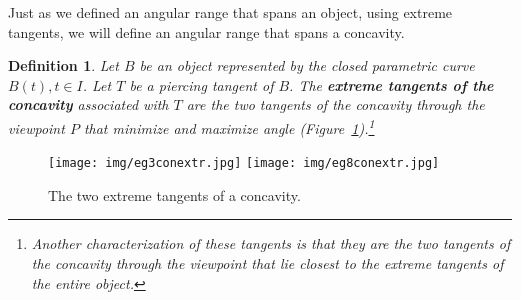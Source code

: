 \documentclass[10pt,twocolumn]{article}
\newtheorem{defn2}{Definition}
\begin{document}
Just as we defined an angular range that spans an object, using extreme tangents,
we will define an angular range that spans a concavity.


\begin{defn2}
Let $B$ be an object represented by the closed parametric curve $B(t), t \in I$.
Let $T$ be a piercing tangent of $B$.
The {\bf extreme tangents of the concavity} associated with $T$  
are the two tangents of the concavity through the viewpoint $P$
that minimize and maximize angle (Figure~\ref{fig:conextr}).\footnote{Another 
  characterization of these tangents
  is that they are the two tangents of the concavity through the viewpoint
  that lie closest to the extreme tangents of the entire object.}
\end{defn2}


\begin{figure}
\begin{center}
\texttt{[image: img/eg3conextr.jpg]}
\texttt{[image: img/eg8conextr.jpg]}
\end{center}
\caption{The two extreme tangents of a concavity.}
\label{fig:conextr}
\end{figure}
\end{document}
